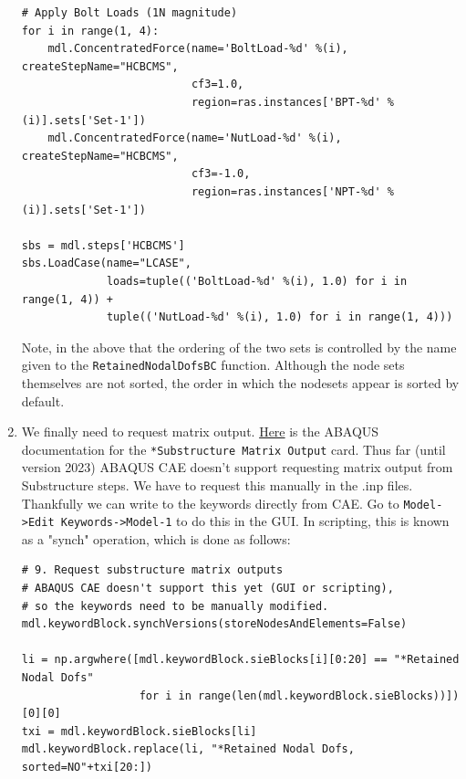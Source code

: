 \documentclass[11pt]{article}
\begin{document}
\begin{enumerate}
\begin{verbatim}
# Apply Bolt Loads (1N magnitude)
for i in range(1, 4):
    mdl.ConcentratedForce(name='BoltLoad-%d' %(i), createStepName="HCBCMS",
                          cf3=1.0,
                          region=ras.instances['BPT-%d' %(i)].sets['Set-1'])
    mdl.ConcentratedForce(name='NutLoad-%d' %(i), createStepName="HCBCMS",
                          cf3=-1.0,
                          region=ras.instances['NPT-%d' %(i)].sets['Set-1'])

sbs = mdl.steps['HCBCMS']
sbs.LoadCase(name="LCASE",
             loads=tuple(('BoltLoad-%d' %(i), 1.0) for i in range(1, 4)) +
             tuple(('NutLoad-%d' %(i), 1.0) for i in range(1, 4)))
\end{verbatim}
Note, in the above that the ordering of the two sets is controlled by the name given to the \texttt{RetainedNodalDofsBC} function.
Although the node sets themselves are not sorted, the order in which the nodesets appear is sorted by default.
\item We finally need to request matrix output.
\href{https://classes.engineering.wustl.edu/2009/spring/mase5513/abaqus/docs/v6.6/books/key/default.htm?startat=ch18abk43.html}{Here} is the ABAQUS documentation for the \texttt{*Substructure Matrix Output} card.
Thus far (until version 2023) ABAQUS CAE doesn't support requesting matrix output from Substructure steps.
We have to request this manually in the .inp files.
Thankfully we can write to the keywords directly from CAE.
Go to \texttt{Model->Edit Keywords->Model-1} to do this in the GUI.
In scripting, this is known as a "synch" operation, which is done as follows:
\begin{verbatim}
# 9. Request substructure matrix outputs
# ABAQUS CAE doesn't support this yet (GUI or scripting),
# so the keywords need to be manually modified.
mdl.keywordBlock.synchVersions(storeNodesAndElements=False)

li = np.argwhere([mdl.keywordBlock.sieBlocks[i][0:20] == "*Retained Nodal Dofs"
                  for i in range(len(mdl.keywordBlock.sieBlocks))])[0][0]
txi = mdl.keywordBlock.sieBlocks[li]
mdl.keywordBlock.replace(li, "*Retained Nodal Dofs, sorted=NO"+txi[20:])


\end{verbatim}
\end{enumerate}
\end{document}
